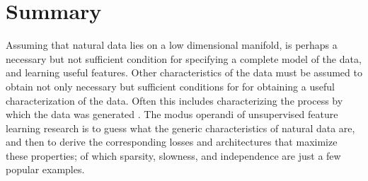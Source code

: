 \section{Summary} 
Assuming that natural data lies on a low dimensional manifold, is perhaps a
necessary but not sufficient condition for specifying a complete model of the
data, and learning useful features.  Other characteristics of the data must be
assumed to obtain not only necessary but sufficient conditions for for
obtaining a useful characterization of the data. Often this includes
characterizing the process by which the data was generated
\cite{bishop2006pattern,blei2003latent}.   The modus operandi of unsupervised
feature learning research is to guess what the generic characteristics of
natural data are, and then to derive the corresponding losses and architectures
that maximize these properties; of which sparsity, slowness, 
and independence are just a few popular examples.      
